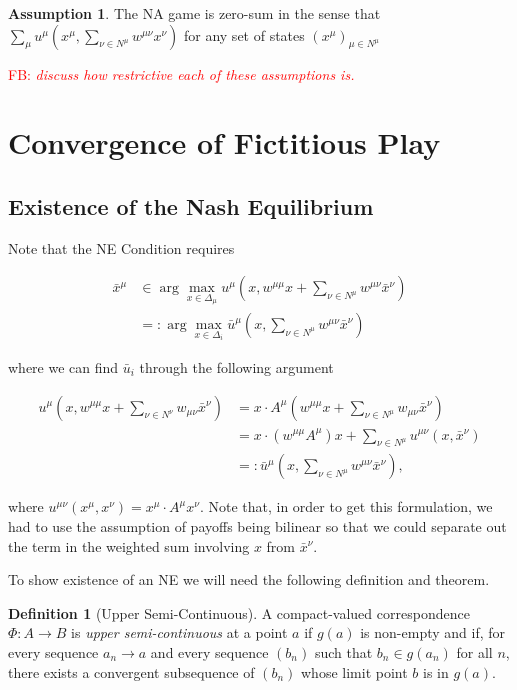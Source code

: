 \documentclass{article}
\theoremstyle{definition}
\newtheorem*{definition}{Definition}
\newtheorem{assumption}{Assumption}
\newcommand{\fb}[1]{\textcolor{red}{FB: \textit{#1}}}
\newcommand{\wmunu}{w^{\mu \nu}}
\newcommand{\xmu}{x^{\mu}}
\newcommand{\xnu}{x^{\nu}}
\newcommand{\NE}[1]{\bar{x}^{#1}}
\newcommand{\weightedsum}{ \sum_{\nu \in N^\mu} \wmunu \xnu}
\begin{document}
	\begin{assumption}
		The NA game is zero-sum in the sense that $\sum_{\mu} u^\mu(\xmu, \weightedsum)$ for any set
		of states $(x^\mu)_{\mu \in N^\mu}$
	\end{assumption}

\fb{discuss how restrictive each of these assumptions is.}
        

	\section{Convergence of Fictitious Play}

	\subsection{Existence of the Nash Equilibrium}
	
	Note that the NE Condition requires

	\begin{align}
		\NE{\mu} &\in \arg\max_{x \in \Delta_\mu} u^\mu(x, w^{\mu \mu}x + \sum_{\nu \in N^\mu} w^{\mu \nu} \NE{\nu}) \nonumber \\
		& =: \arg\max_{x \in \Delta_i} \bar{u}^\mu(x, \sum_{\nu \in N^\mu} w^{\mu \nu} \NE{\nu})
	\end{align}

	where we can find $\bar{u}_i$ through the following argument
	
	\begin{align}
		u^\mu(x, w^{\mu \mu} x + \sum_{\nu \in N^\nu} w_{\mu \nu} \NE{\nu}) & = x \cdot A^\mu (w^{\mu \mu} x + \sum_{\nu \in N^\mu} w_{\mu \nu} \NE{\nu}) \\
		 & = x \cdot (w^{\mu \mu} A^\mu)  x + \sum_{\nu \in N^\mu} u^{\mu \nu}(x, \NE{\nu}) \\
		 & =: \bar{u}^\mu(x, \sum_{\nu \in N^\mu} w^{\mu \nu} \NE{\nu}), \nonumber
	\end{align}
	
	where $u^{\mu \nu}(\xmu, x^\nu) = \xmu \cdot A^\mu x^\nu$. Note that, in order to get this
	formulation, we had to use the assumption of payoffs being bilinear so that we could separate
	out the term in the weighted sum involving $x$ from $\bar{x}^\nu$. 
	
	To show existence of an NE we will need the following definition and theorem.

	\begin{definition}[Upper Semi-Continuous]
		A compact-valued correspondence $\Phi: A \rightarrow B$ is \emph{upper semi-continuous} at a point $a$ if $g(a)$ is non-empty and if, for every sequence $a_n \rightarrow a$ and every sequence $(b_n)$ such that $b_n \in g(a_n)$ for all $n$, there exists a convergent subsequence of $(b_n)$ whose limit point $b$ is in $g(a)$.  
	\end{definition}
\end{document}

